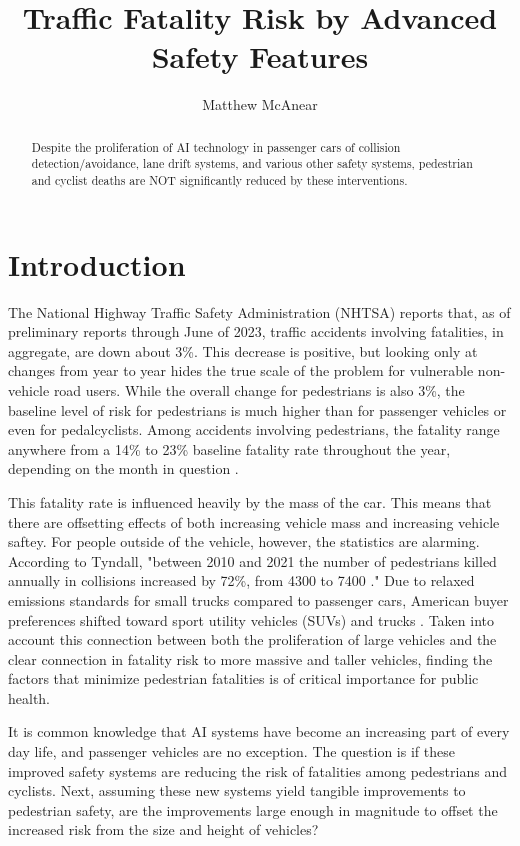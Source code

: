 \documentclass[12pt]{article}
\author{Matthew McAnear}
\title{Traffic Fatality Risk by Advanced Safety Features}
\begin{document}
\maketitle

\begin{abstract}
    Despite the proliferation of AI technology in passenger cars of collision detection/avoidance, lane drift systems, and
    various other safety systems, pedestrian and cyclist deaths are NOT significantly reduced by these
    interventions.
\end{abstract}


\section{Introduction}

The National Highway Traffic Safety Administration (NHTSA) reports that, as of preliminary reports through
June of 2023, traffic accidents involving fatalities, in aggregate, are down about 3\%. This decrease is positive,
but looking only at changes from year to year hides the true scale of the problem for vulnerable non-vehicle
road users. While the overall change for pedestrians is also 3\%, the baseline level of risk for pedestrians is
much higher than for passenger vehicles or even for pedalcyclists. Among accidents involving pedestrians, the fatality
range anywhere from a 14\% to 23\% baseline fatality rate throughout the year, depending on the month in
question \cite{national_highway_traffic_safety_administration_early_2024}.

This fatality rate is influenced heavily by the mass of the car\cite{evans_car_1992}. This means that there
are offsetting effects of both increasing vehicle mass and increasing
vehicle saftey. For people outside of the vehicle, however, the statistics are alarming. According to Tyndall,
"between 2010 and 2021 the number of pedestrians killed annually in collisions increased by 72\%, from 4300 to
7400 \cite{tyndall_effect_2024}." Due to relaxed emissions standards for small trucks compared to passenger cars,
American buyer preferences shifted toward sport utility vehicles (SUVs) and trucks \cite{kovach_rise_2021}. Taken into
account this connection between both the proliferation of large vehicles and the clear connection in fatality risk to
more massive and taller vehicles\cite{tyndall_effect_2024}, finding the factors that minimize pedestrian fatalities
is of critical importance for public health.

It is common knowledge that AI systems have become an increasing part of every day life, and passenger
vehicles are no exception. The question is if these improved safety systems are reducing the risk of fatalities
among pedestrians and cyclists. Next, assuming these new systems yield tangible improvements to pedestrian safety,
are the improvements large enough in magnitude to offset the increased risk from the size and height of vehicles?
\end{document}
